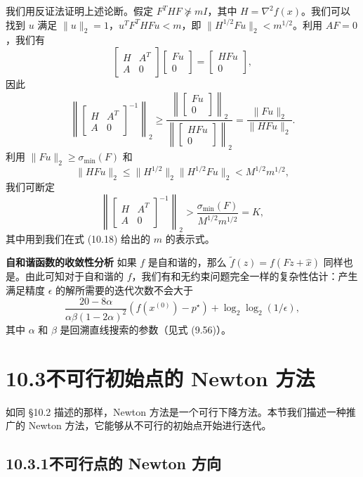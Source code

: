 \documentclass[UTF8,12pt,a4paper,fontset=fandol]{ctexart}
\begin{document}
我们用反证法证明上述论断。假定 $F^THF\nsucceq mI$，其中 $H=\nabla^2 f(x)$。我们可以找到 $u$ 满足 $\|u\|_2=1$，$u^TF^THFu<m$，即 $\|H^{1/2}Fu\|_2<m^{1/2}$。利用 $AF=0$，我们有
\[
\begin{bmatrix}
H & A^T\\
A & 0
\end{bmatrix}
\begin{bmatrix}
Fu\\
0
\end{bmatrix}
=
\begin{bmatrix}
HFu\\
0
\end{bmatrix},
\]
因此
\[
\left\|
\begin{bmatrix}
H & A^T\\
A & 0
\end{bmatrix}^{-1}
\right\|_2
\geq
\frac{\left\|\begin{bmatrix}Fu\\0\end{bmatrix}\right\|_2}
{\left\|\begin{bmatrix}HFu\\0\end{bmatrix}\right\|_2}
=\frac{\|Fu\|_2}{\|HFu\|_2}.
\]
利用 $\|Fu\|_2\geq\sigma_{\min}(F)$ 和
\[
\|HFu\|_2\leq \|H^{1/2}\|_2\|H^{1/2}Fu\|_2<M^{1/2}m^{1/2},
\]
我们可断定
\[
\left\|
\begin{bmatrix}
H & A^T\\
A & 0
\end{bmatrix}^{-1}
\right\|_2
>\frac{\sigma_{\min}(F)}{M^{1/2}m^{1/2}}=K,
\]
其中用到我们在式 (10.18) 给出的 $m$ 的表示式。

\noindent\textbf{自和谐函数的收敛性分析}\quad
如果 $f$ 是自和谐的，那么 $\tilde{f}(z)=f(Fz+\hat{x})$ 同样也是。由此可知对于自和谐的 $f$，我们有和无约束问题完全一样的复杂性估计：产生满足精度 $\epsilon$ 的解所需要的迭代次数不会大于
\[
\frac{20-8\alpha}{\alpha\beta(1-2\alpha)^2}(f(x^{(0)})-p^\star)+\log_2\log_2(1/\epsilon),
\]
其中 $\alpha$ 和 $\beta$ 是回溯直线搜索的参数（见式 (9.56)）。

\section*{10.3\quad 不可行初始点的 Newton 方法}

如同 \S10.2 描述的那样，Newton 方法是一个可行下降方法。本节我们描述一种推广的 Newton 方法，它能够从不可行的初始点开始进行迭代。

\subsection*{10.3.1\quad 不可行点的 Newton 方向}
\end{document}
